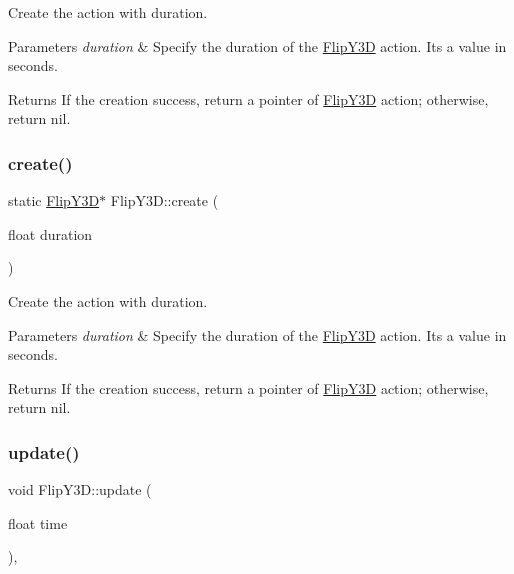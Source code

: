 Create the action with duration. 


\begin{DoxyParams}{Parameters}
{\em duration} & Specify the duration of the \hyperlink{classFlipY3D}{Flip\+Y3D} action. It\textquotesingle{}s a value in seconds. \\
\hline
\end{DoxyParams}
\begin{DoxyReturn}{Returns}
If the creation success, return a pointer of \hyperlink{classFlipY3D}{Flip\+Y3D} action; otherwise, return nil. 
\end{DoxyReturn}
\mbox{\label{classFlipY3D_aea35c54194cefee880d3756530e98bf5}} 
\subsubsection{\texorpdfstring{create()}{create()}\hspace{0.1cm}{\footnotesize\ttfamily [2/2]}}
{\footnotesize\ttfamily static \hyperlink{classFlipY3D}{Flip\+Y3D}$\ast$ Flip\+Y3\+D\+::create (\begin{DoxyParamCaption}\item[{float}]{duration }\end{DoxyParamCaption})\hspace{0.3cm}{\ttfamily [static]}}



Create the action with duration. 


\begin{DoxyParams}{Parameters}
{\em duration} & Specify the duration of the \hyperlink{classFlipY3D}{Flip\+Y3D} action. It\textquotesingle{}s a value in seconds. \\
\hline
\end{DoxyParams}
\begin{DoxyReturn}{Returns}
If the creation success, return a pointer of \hyperlink{classFlipY3D}{Flip\+Y3D} action; otherwise, return nil. 
\end{DoxyReturn}
\mbox{\label{classFlipY3D_ad3c0474d05070c8defea64cc4d47d8b6}} 
\subsubsection{\texorpdfstring{update()}{update()}\hspace{0.1cm}{\footnotesize\ttfamily [1/2]}}
{\footnotesize\ttfamily void Flip\+Y3\+D\+::update (\begin{DoxyParamCaption}\item[{float}]{time }\end{DoxyParamCaption})\hspace{0.3cm}{\ttfamily [override]}, {\ttfamily [virtual]}}

